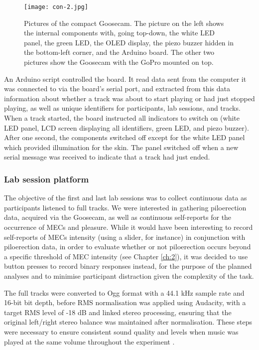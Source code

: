 \begin{figure}[t!]
\texttt{[image: con-2.jpg]}
\centering
\caption{Pictures of the compact Goosecam. The picture on the left shows the internal components with, going top-down, the white LED panel, the green LED, the OLED display, the piezo buzzer hidden in the bottom-left corner, and the Arduino board. The other two pictures show the Goosecam with the GoPro mounted on top.}
\label{fig:con-2}
\end{figure}

An Arduino script controlled the board. It read data sent from the computer it was connected to via the board's serial port, and extracted from this data information about whether a track was about to start playing or had just stopped playing, as well as unique identifiers for participants, lab sessions, and tracks. When a track started, the board instructed all indicators to switch on (white LED panel, LCD screen displaying all identifiers, green LED, and piezo buzzer). After one second, the components switched off except for the white LED panel which provided illumination for the skin. The panel switched off when a new serial message was received to indicate that a track had just ended.

\subsubsection{Lab session platform}

The objective of the first and last lab sessions was to collect continuous data as participants listened to full tracks. We were interested in gathering piloerection data, acquired via the Goosecam, as well as continuous self-reports for the occurrence of MECs and pleasure. While it would have been interesting to record self-reports of MECs intensity (using a slider, for instance) in conjunction with piloerection data, in order to evaluate whether or not piloerection occurs beyond a specific threshold of MEC intensity (see Chapter \ref{ch:2}), it was decided to use button presses to record binary responses instead, for the purpose of the planned analyses and to minimise participant distraction given the complexity of the task.

The full tracks were converted to Ogg format with a 44.1 kHz sample rate and 16-bit bit depth, before RMS normalisation was applied using Audacity, with a target RMS level of -18 dB and linked stereo processing, ensuring that the original left/right stereo balance was maintained after normalisation. These steps were necessary to ensure consistent sound quality and levels when music was played at the same volume throughout the experiment \parencite{mori2014a}.

